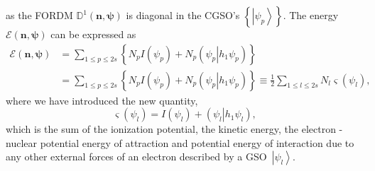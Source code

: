 \documentclass[aps,preprint]{revtex4}%
\begin{document}
as the FORDM $\mathbb{D}^{1}\left(  \mathbf{n},\mathbf{\psi}\right)  $ is
diagonal in the CGSO's $\left\{  \left\vert \psi_{p}\right\rangle \right\}  .$
The energy $\mathcal{E}\left(  \mathbf{n},\mathbf{\psi}\right)  $ can be
expressed as
\begin{align}
\mathcal{E}\left(  \mathbf{n},\mathbf{\psi}\right)   &  =\sum_{1\leq p\leq
2s}\left\{  N_{p}I\left(  \psi_{p}\right)  +N_{p}\left(  \left.  \psi
_{p}\right\vert h_{1}\psi_{p}\right)  \right\}  \\
&  =\sum_{1\leq p\leq2s}\left\{  N_{p}I\left(  \psi_{p}\right)  +N_{p}\left(
\left.  \psi_{p}\right\vert h_{1}\psi_{p}\right)  \right\}  \equiv\frac{1}{2}%
{\textstyle\sum\limits_{1\leq l\leq2s}}
N_{l}\varsigma\left(  \psi_{l}\right)  ,
\end{align}
where we have introduced the new quantity,
\begin{equation}
\varsigma\left(  \psi_{l}\right)  =I\left(  \psi_{l}\right)  +\left(  \left.
\psi_{l}\right\vert h_{1}\psi_{l}\right)  ,
\end{equation}
which is the sum of the ionization potential, the kinetic energy, the electron
- nuclear potential energy of attraction and potential energy of interaction
due to any other external forces of an electron described by a
GSO\ $\left\vert \psi_{l}\right\rangle $. 
\end{document}
